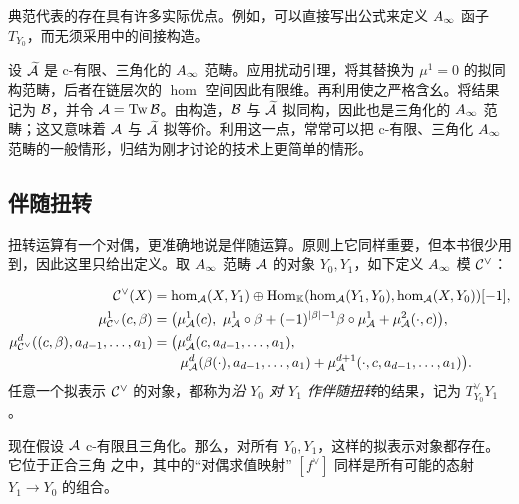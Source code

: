 典范代表的存在具有许多实际优点。例如，可以直接写出公式来定义 $A_\infty$ 函子 $T_{Y_0}$，而无须采用中的间接构造。
\begin{note}\label{st:5.10}
设 $\widetilde{\mathcal A}$ 是 c-有限、三角化的 $A_\infty$ 范畴。应用扰动引理，将其替换为 $\mu^1=0$ 的拟同构范畴，后者在链层次的 $\hom$ 空间因此有限维。再利用使之严格含幺。将结果记为 $\mathcal B$，并令 $\mathcal A=\operatorname{Tw}\mathcal B$。由构造，$\mathcal B$ 与 $\widetilde{\mathcal A}$ 拟同构，因此也是三角化的 $A_\infty$ 范畴；这又意味着 $\mathcal A$ 与 $\widetilde{\mathcal A}$ 拟等价。利用这一点，常常可以把 c-有限、三角化 $A_\infty$ 范畴的一般情形，归结为刚才讨论的技术上更简单的情形。
\end{note}

\subsection{伴随扭转}\label{sec:5g}
扭转运算有一个对偶，更准确地说是伴随运算。原则上它同样重要，但本书很少用到，因此这里只给出定义。取 $A_\infty$ 范畴 $\mathcal A$ 的对象 $Y_0,Y_1$，如下定义 $A_\infty$ 模 $\mathcal C^{\vee}$：
\begin{definition*}
\begin{equation}\label{eq:5.19}
\begin{aligned}
\C^{\vee}(X)&=\hom_{\A}(X,Y_1)\oplus\Hom_{\K}(\hom_{\A}(Y_1,Y_0),\hom_{\A}(X,Y_0))[-1],\\
\mu^1_{\C^{\vee}}(c,\beta)&=\bigl(\mu^1_{\A}(c),\ \mu^1_{\A}\circ\beta+(-1)^{|\beta|-1}\beta\circ\mu^1_{\A}+\mu^2_{\A}(\cdot,c)\bigr),\\
\mu^d_{\C^{\vee}}((c,\beta),a_{d-1},\ldots,a_1)
&=\bigl(\mu^d_{\A}(c,a_{d-1},\ldots,a_1),\\[-2pt]
&\qquad\mu^d_{\A}(\beta(\cdot),a_{d-1},\ldots,a_1)+\mu^{d+1}_{\A}(\cdot,c,a_{d-1},\ldots,a_1)\bigr).
\end{aligned}
\end{equation}
任意一个拟表示 $\mathcal C^{\vee}$ 的对象，都称为\emph{沿 $Y_0$ 对 $Y_1$ 作伴随扭转}的结果，记为 $T_{Y_0}^{\vee}Y_1$。
\end{definition*}
现在假设 $\mathcal A$ c-有限且三角化。那么，对所有 $Y_0,Y_1$，这样的拟表示对象都存在。它位于正合三角
之中，其中的“对偶求值映射” $[f^{\vee}]$ 同样是所有可能的态射 $Y_1\to Y_0$ 的组合。


